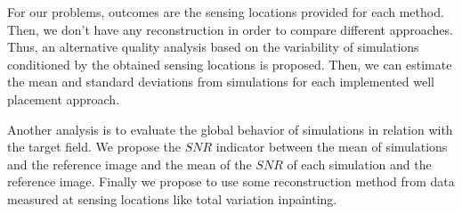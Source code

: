 For our problems, outcomes are the sensing locations provided for each method. Then, we don’t have any reconstruction in order to compare different approaches. Thus, an alternative quality analysis based on the variability of simulations conditioned by the obtained sensing locations is proposed. Then, we can estimate the mean and standard deviations from simulations for each implemented well placement approach.

Another analysis is to evaluate the global behavior of simulations in relation with the target field. We propose the $SNR$ indicator between the mean of simulations and the reference image and the mean of the $SNR$ of each simulation and the reference image. Finally we propose to use some reconstruction method from data measured at sensing locations like total variation inpainting.


